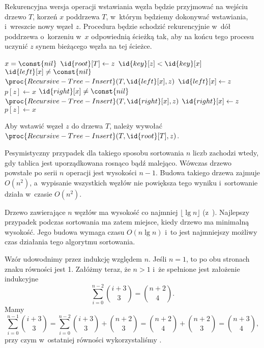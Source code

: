 \exercise %
Rekurencyjna wersja operacji wstawiania węzła będzie przyjmować na wejściu drzewo $T$, korzeń $x$ poddrzewa $T$, w~którym będziemy dokonywać wstawiania, i~wreszcie nowy węzeł $z$. Procedura będzie schodzić rekurencyjnie w~dół poddrzewa o~korzeniu w~$x$ odpowiednią ścieżką tak, aby na końcu tego procesu uczynić $z$ synem bieżącego węzła na tej ścieżce.
\begin{codebox}
\li	\If $x=\const{nil}$
\li		\Then
            $\id{root}[T]\gets z$
\li         \Return
		\End
\li	\If $\id{key}[z]<\id{key}[x]$
\li		\Then
			\If $\id{left}[x]\ne\const{nil}$
\li				\Then $\proc{Recursive-Tree-Insert}(T,\id{left}[x],z)$
\li				\Else
					$\id{left}[x]\gets z$
\li					$p[z]\gets x$
				\End
\li		\Else
			\If $\id{right}[x]\ne\const{nil}$
\li				\Then $\proc{Recursive-Tree-Insert}(T,\id{right}[x],z)$
\li				\Else
					$\id{right}[x]\gets z$
\li					$p[z]\gets x$
				\End
		\End
\end{codebox}
Aby wstawić węzeł $z$ do drzewa $T$, należy wywołać $\proc{Recursive-Tree-Insert}(T,\id{root}[T],z)$.

\exercise %
\exercise %
Pesymistyczny przypadek dla takiego sposobu sortowania $n$ liczb zachodzi wtedy, gdy tablica jest uporządkowana rosnąco bądź malejąco. Wówczas drzewo powstałe po serii $n$ operacji  jest wysokości $n-1$. Budowa takiego drzewa zajmuje $O(n^2)$, a~wypisanie wszystkich węzłów nie powiększa tego wyniku i~sortowanie działa w~czasie $O(n^2)$.

Drzewo zawierające $n$ węzłów ma wysokość co najmniej $\lfloor\lg n\rfloor$ (z~). Najlepszy przypadek podczas sortowania ma zatem miejsce, kiedy drzewo ma minimalną wysokość. Jego budowa wymaga czasu $O(n\lg n)$ i~to jest najmniejszy możliwy czas działania tego algorytmu sortowania.

\exercise %
\exercise %
\exercise %


\exercise %
Wzór udowodnimy przez indukcję względem $n$. Jeśli $n=1$, to po obu stronach znaku równości jest 1. Załóżmy teraz, że $n>1$ i~że spełnione jest założenie indukcyjne
\[
	\sum_{i=0}^{n-2}\binom{i+3}{3} = \binom{n+2}{4}.
\]
Mamy
\[
	\sum_{i=0}^{n-1}\binom{i+3}{3} = \sum_{i=0}^{n-2}\binom{i+3}{3}+\binom{n+2}{3} = \binom{n+2}{4}+\binom{n+2}{3} = \binom{n+3}{4},
\]
przy czym w~ostatniej równości wykorzystaliśmy .

